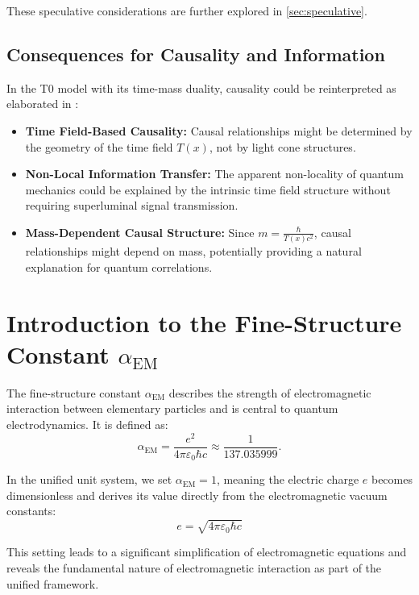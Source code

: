 \documentclass[12pt,a4paper]{article}
\newcommand{\Tfield}{T(x)}
\newcommand{\alphaEM}{\alpha_{\text{EM}}}
\begin{document}
	These speculative considerations are further explored in \cref{sec:speculative}.
	
	\subsection{Consequences for Causality and Information}
	\label{subsec:causality}
	
	In the T0 model with its time-mass duality, causality could be reinterpreted as elaborated in \cite{pascher_feldtheorie_2025}:
	\begin{itemize}
		\item \textbf{Time Field-Based Causality:} Causal relationships might be determined by the geometry of the time field \(\Tfield\), not by light cone structures.
		\item \textbf{Non-Local Information Transfer:} The apparent non-locality of quantum mechanics could be explained by the intrinsic time field structure without requiring superluminal signal transmission.
		\item \textbf{Mass-Dependent Causal Structure:} Since \(m = \frac{\hbar}{\Tfield c^2}\), causal relationships might depend on mass, potentially providing a natural explanation for quantum correlations.
	\end{itemize}
	
	\section{Introduction to the Fine-Structure Constant \(\alphaEM\)}
	\label{sec:alpha_em}
	
	The fine-structure constant \(\alphaEM\) describes the strength of electromagnetic interaction between elementary particles and is central to quantum electrodynamics. It is defined as:
	\begin{equation}
		\label{eq:alpha_em_def}
		\alphaEM = \frac{e^2}{4\pi \varepsilon_0 \hbar c} \approx \frac{1}{137.035999}.
	\end{equation}
	
	In the unified unit system, we set \(\alphaEM = 1\), meaning the electric charge \(e\) becomes dimensionless and derives its value directly from the electromagnetic vacuum constants:
	\begin{equation}
		\label{eq:charge_relation}
		e = \sqrt{4\pi \varepsilon_0 \hbar c}
	\end{equation}
	
	This setting leads to a significant simplification of electromagnetic equations and reveals the fundamental nature of electromagnetic interaction as part of the unified framework.
	
\end{document}
